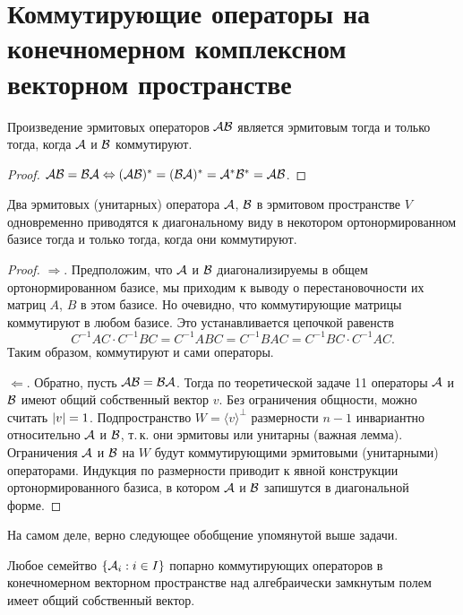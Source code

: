 \section{Коммутирующие операторы на конечномерном комплексном векторном пространстве}

\begin{theorem}
    Произведение эрмитовых операторов $\mathcal{A}\mathcal{B}$ является эрмитовым тогда и только тогда, когда $\mathcal{A}$ и $\mathcal{B}$ коммутируют.
\end{theorem}

\begin{proof}
    $\mathcal{A}\mathcal{B} = \mathcal{B}\mathcal{A} \Leftrightarrow (\mathcal{A}\mathcal{B})^\ast = (\mathcal{B}\mathcal{A})^\ast = \mathcal{A}^\ast\mathcal{B}^\ast = \mathcal{A}\mathcal{B}$.
\end{proof}

\begin{theorem}
    Два эрмитовых (унитарных) оператора $\mathcal{A}$, $\mathcal{B}$ в эрмитовом пространстве $V$ одновременно приводятся к диагональному виду в некотором ортонормированном базисе тогда и только тогда, когда они коммутируют.
\end{theorem}

\begin{proof}
    $\Rightarrow$. Предположим, что $\mathcal{A}$ и $\mathcal{B}$ диагонализируемы в общем ортонормированном базисе, мы приходим к выводу о перестановочности их матриц $A$, $B$ в этом базисе. Но очевидно, что коммутирующие матрицы коммутируют в любом базисе. Это устанавливается цепочкой равенств
    \[
        C^{-1}AC \cdot C^{-1}BC = C^{-1}ABC = C^{-1}BAC = C^{-1}BC \cdot C^{-1}AC.
    \]
    Таким образом, коммутируют и сами операторы.

    $\Leftarrow$. Обратно, пусть $\mathcal{A}\mathcal{B} = \mathcal{B}\mathcal{A}$. Тогда по теоретической задаче 11 операторы $\mathcal{A}$ и $\mathcal{B}$ имеют общий собственный вектор $v$. Без ограничения общности, можно считать $\left\lvert v\right\rvert = 1$. Подпространство $W = \langle v\rangle^\perp$ размерности $n - 1$ инвариантно относительно $\mathcal{A}$ и $\mathcal{B}$, т.\,к. они эрмитовы или унитарны (важная лемма). Ограничения $\mathcal{A}$ и $\mathcal{B}$ на $W$ будут коммутирующими эрмитовыми (унитарными) операторами. Индукция по размерности приводит к явной конструкции ортонормированного базиса, в котором $\mathcal{A}$ и $\mathcal{B}$ запишутся в диагональной форме.
\end{proof}

На самом деле, верно следующее обобщение упомянутой выше задачи.

\begin{theorem}
    Любое семейтво $\{\mathcal{A}_i : i \in I\}$ попарно коммутирующих операторов в конечномерном векторном пространстве над алгебраически замкнутым полем имеет общий собственный вектор.
\end{theorem}

